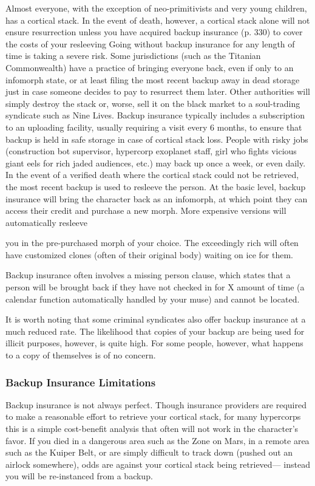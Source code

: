Almost everyone, with the exception of neo-primitivists and very young children, has a cortical stack. In the event of death, however, a cortical stack alone will not ensure resurrection unless you have acquired backup insurance (p. 330) to cover the costs of your resleeving Going without backup insurance for any length of time is taking a severe risk. Some jurisdictions (such as the Titanian Commonwealth) have a practice of bringing everyone back, even if only to an infomorph state, or at least filing the most recent backup away in dead storage just in case someone decides to pay to resurrect them later. Other authorities will simply destroy the stack or, worse, sell it on the black market to a soul-trading syndicate such as Nine Lives. Backup insurance typically includes a subscription to an uploading facility, usually requiring a visit every 6 months, to ensure that backup is held in safe storage in case of cortical stack loss. People with risky jobs (construction bot supervisor, hypercorp exoplanet staff, girl who fights vicious giant eels for rich jaded audiences, etc.) may back up once a week, or even daily. In the event of a verified death where the cortical stack could not be retrieved, the most recent backup is used to resleeve the person. At the basic level, backup insurance will bring the character back as an infomorph, at which point they can access their credit and purchase a new morph. More expensive versions will automatically resleeve 

you in the pre-purchased morph of your choice. The exceedingly rich will often have customized clones (often of their original body) waiting on ice for them. 

Backup insurance often involves a missing person clause, which states that a person will be brought back if they have not checked in for X amount of time (a calendar function automatically handled by your muse) and cannot be located. 

It is worth noting that some criminal syndicates also offer backup insurance at a much reduced rate. The likelihood that copies of your backup are being used for illicit purposes, however, is quite high. For some people, however, what happens to a copy of themselves is of no concern. 

\subsubsection{Backup Insurance Limitations} 

Backup insurance is not always perfect. Though insurance providers are required to make a reasonable effort to retrieve your cortical stack, for many hypercorps this is a simple cost-benefit analysis that often will not work in the character's favor. If you died in a dangerous area such as the Zone on Mars, in a remote area such as the Kuiper Belt, or are simply difficult to track down (pushed out an airlock somewhere), odds are against your cortical stack being retrieved— instead you will be re-instanced from a backup. 

